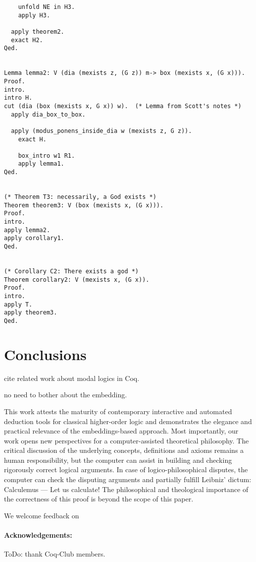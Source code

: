 \documentclass{llncs}
\begin{document}
\begin{verbatim}
    unfold NE in H3.
    apply H3.

  apply theorem2.
  exact H2.
Qed.


Lemma lemma2: V (dia (mexists z, (G z)) m-> box (mexists x, (G x))).
Proof.
intro.
intro H.
cut (dia (box (mexists x, G x)) w).  (* Lemma from Scott's notes *)
  apply dia_box_to_box.

  apply (modus_ponens_inside_dia w (mexists z, G z)).
    exact H.
       
    box_intro w1 R1.
    apply lemma1.
Qed.


(* Theorem T3: necessarily, a God exists *)
Theorem theorem3: V (box (mexists x, (G x))).
Proof.
intro.
apply lemma2.
apply corollary1.
Qed.


(* Corollary C2: There exists a god *)
Theorem corollary2: V (mexists x, (G x)).
Proof.
intro.
apply T.
apply theorem3.
Qed.
\end{verbatim}


\section{Conclusions}
\label{sec:conclusions}

cite related work about modal logics in Coq.

no need to bother about the embedding.

This work attests the maturity of contemporary interactive and
automated deduction tools for classical higher-order logic and
demonstrates the elegance and practical relevance of the
embeddings-based approach.  Most importantly, our work opens new
perspectives for a computer-assisted theoretical philosophy.  The
critical discussion of the underlying concepts, definitions and axioms
remains a human responsibility, but the computer can assist in
building and checking rigorously correct logical arguments. In case of
logico-philosophical disputes, the computer can check the disputing
arguments and partially fulfill Leibniz' dictum: Calculemus --- Let us
calculate!
The philosophical and theological importance of the correctness of this proof is beyond the scope of this paper.

We welcome feedback on 

\paragraph{Acknowledgements:} ToDo: thank Coq-Club members.
\end{document}
